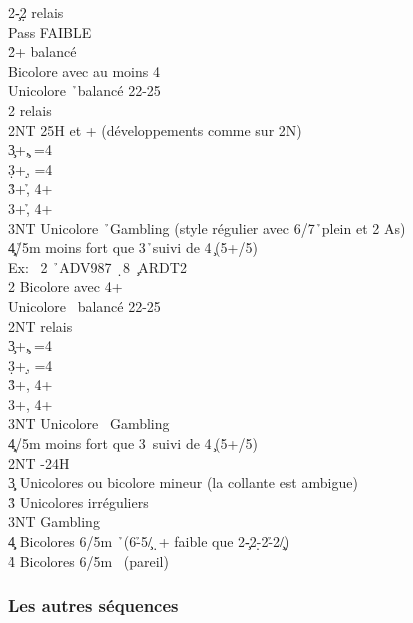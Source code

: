 \documentclass[a4paper]{article}
\begin{document}
\begin{bidtable}
2\c-2\d \> relais\\
Pass \> FAIBLE \d \\
2\h {}+ balancé\+\\
Bicolore \> avec au moins 4\h \\
Unicolore \> \h\ balancé 22-25\\
2\s \> relais\+\\
2NT \> 25H et + (développements comme sur 2N)\\
3\c {}+\c , =4\h \\
3\d {}+\d , =4\h \\
3\h {}+\h , 4+\c \\
3\s {}+\h , 4+\d \\
3NT \> Unicolore \h\ Gambling (style régulier avec 6/7\h\ plein et 2 As)\\
4\c\d {}\h /5m moins fort que 3\h\ suivi de 4\c\ (5+/5)\\
\>Ex: \s\ 2 \h\ ADV987 \d\ 8 \c\ ARDT2\-\-\\
2\s \> Bicolore avec 4+\s \+\\
Unicolore \> \s\ balancé 22-25\\
2NT \> relais\+\\
3\c {}+\c , =4\s \\
3\d {}+\d , =4\s \\
3\h {}+\s , 4+\c \\
3\s {}+\s , 4+\d \\
3NT \> Unicolore \s\ Gambling\\
4\c\d {}\s /5m moins fort que 3\s\ suivi de 4\c\ (5+/5)\-\-\\
2NT -24H\\
3\c\d \> Unicolores ou bicolore mineur (la collante est ambigue)\\
3\h\s \> Unicolores irréguliers\\
3NT \> Gambling \c \\
4\c\d \> Bicolores 6/5m \h\ (6\h -5\c /\d\ + faible que 2\c -2\d -2\h -2\c /\d )\\
4\h\s \> Bicolores 6/5m \s\ (pareil)
\end{bidtable}

\subsubsection{Les autres séquences}
\end{document}
